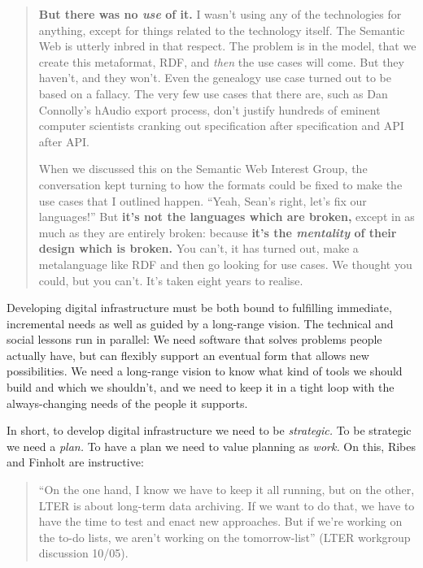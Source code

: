 \documentclass[10pt]{article}
\begin{document}
\begin{multicols}{2}
\begin{quote}
\textbf{But there was no \emph{use} of it.} I wasn't using any of the
technologies for anything, except for things related to the technology
itself. The Semantic Web is utterly inbred in that respect. The problem
is in the model, that we create this metaformat, RDF, and \emph{then}
the use cases will come. But they haven't, and they won't. Even the
genealogy use case turned out to be based on a fallacy. The very few use
cases that there are, such as Dan Connolly's hAudio export process,
don't justify hundreds of eminent computer scientists cranking out
specification after specification and API after API.

When we discussed this on the Semantic Web Interest Group, the
conversation kept turning to how the formats could be fixed to make the
use cases that I outlined happen. ``Yeah, Sean's right, let's fix our
languages!'' But \textbf{it's not the languages which are broken,}
except in as much as they are entirely broken: because \textbf{it's the
\emph{mentality} of their design which is broken.} You can't, it has
turned out, make a metalanguage like RDF and then go looking for use
cases. We thought you could, but you can't. It's taken eight years to
realise. \cite{palmerDitchingSemanticWeb2008} 
\end{quote}

Developing digital infrastructure must be both bound to fulfilling
immediate, incremental needs as well as guided by a long-range vision.
The technical and social lessons run in parallel: We need software that
solves problems people actually have, but can flexibly support an
eventual form that allows new possibilities. We need a long-range vision
to know what kind of tools we should build and which we shouldn't, and
we need to keep it in a tight loop with the always-changing needs of the
people it supports.

In short, to develop digital infrastructure we need to be
\emph{strategic.} To be strategic we need a \emph{plan.} To have a plan
we need to value planning as \emph{work.} On this, Ribes and Finholt are
instructive:

\begin{quote}
``On the one hand, I know we have to keep it all running, but on the
other, LTER is about long-term data archiving. If we want to do that, we
have to have the time to test and enact new approaches. But if we're
working on the to-do lists, we aren't working on the tomorrow-list''
(LTER workgroup discussion 10/05).


\end{quote}
\end{multicols}
\end{document}
